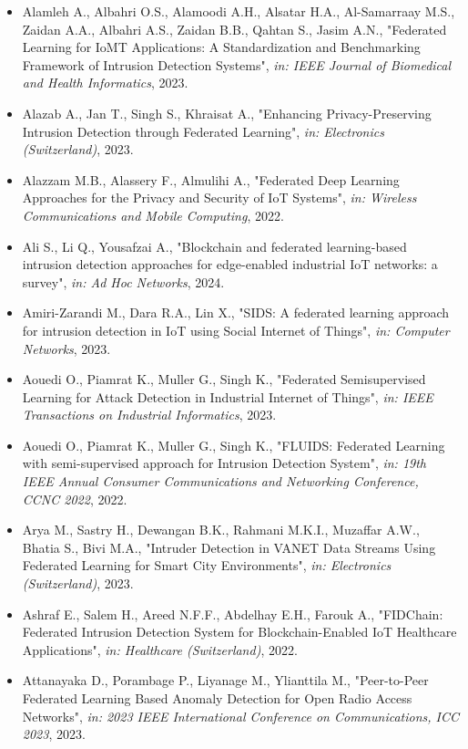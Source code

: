 \begin{itemize}
  \item Alamleh A., Albahri O.S., Alamoodi A.H., Alsatar H.A., Al-Samarraay M.S., Zaidan A.A., Albahri A.S., Zaidan B.B., Qahtan S., Jasim A.N., "Federated Learning for IoMT Applications: A Standardization and Benchmarking Framework of Intrusion Detection Systems", \textit{in: IEEE Journal of Biomedical and Health Informatics}, 2023.
  \item Alazab A., Jan T., Singh S., Khraisat A., "Enhancing Privacy-Preserving Intrusion Detection through Federated Learning", \textit{in: Electronics (Switzerland)}, 2023.
  \item Alazzam M.B., Alassery F., Almulihi A., "Federated Deep Learning Approaches for the Privacy and Security of IoT Systems", \textit{in: Wireless Communications and Mobile Computing}, 2022.
  \item Ali S., Li Q., Yousafzai A., "Blockchain and federated learning-based intrusion detection approaches for edge-enabled industrial IoT networks: a survey", \textit{in: Ad Hoc Networks}, 2024.
  \item Amiri-Zarandi M., Dara R.A., Lin X., "SIDS: A federated learning approach for intrusion detection in IoT using Social Internet of Things", \textit{in: Computer Networks}, 2023.
  \item Aouedi O., Piamrat K., Muller G., Singh K., "Federated Semisupervised Learning for Attack Detection in Industrial Internet of Things", \textit{in: IEEE Transactions on Industrial Informatics}, 2023.
  \item Aouedi O., Piamrat K., Muller G., Singh K., "FLUIDS: Federated Learning with semi-supervised approach for Intrusion Detection System", \textit{in: 19th IEEE Annual Consumer Communications and Networking Conference, CCNC 2022}, 2022.
  \item Arya M., Sastry H., Dewangan B.K., Rahmani M.K.I., Muzaffar A.W., Bhatia S., Bivi M.A., "Intruder Detection in VANET Data Streams Using Federated Learning for Smart City Environments", \textit{in: Electronics (Switzerland)}, 2023.
  \item Ashraf E., Salem H., Areed N.F.F., Abdelhay E.H., Farouk A., "FIDChain: Federated Intrusion Detection System for Blockchain-Enabled IoT Healthcare Applications", \textit{in: Healthcare (Switzerland)}, 2022.
  \item Attanayaka D., Porambage P., Liyanage M., Ylianttila M., "Peer-to-Peer Federated Learning Based Anomaly Detection for Open Radio Access Networks", \textit{in: 2023 IEEE International Conference on Communications, ICC 2023}, 2023.

\end{itemize}
